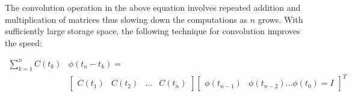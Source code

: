 The convolution operation in the above equation involves repeated addition and multiplication of matrices thus slowing down the computations as $n$ grows. With sufficiently large storage space, the following technique for convolution improves the speed:

\begin{align}
\sum\limits_{k = 1}^n C(t_k )&{\phi (t_n  - t_k )} = \nonumber \\
& \begin{bmatrix}
C(t_1) &  C(t_2) & ... & C(t_n)
\end{bmatrix}
 \begin{bmatrix}
{\phi(t_{n-1})} & {\phi(t_{n-2})} ... {\phi(t_0)}=I
\end{bmatrix}^T
\end{align}

